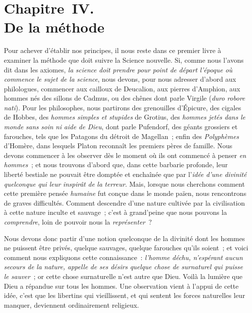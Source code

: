 \documentclass[french,twoside]{book} %
\newcommand\chapteropen{} %
\newcommand\chaptercont{} %
\begin{document}
\chapteropen
\chapter[{Chapitre IV. De la méthode}]{Chapitre IV. \\
De la méthode}

\chaptercont
\noindent  Pour achever d’établir nos principes, il nous reste dans ce premier livre à examiner la méthode que doit suivre la Science nouvelle. Si, comme nous l’avons dit dans les axiomes, {\itshape la science doit prendre pour point de départ l’époque où commence le sujet de la science}, nous devons, pour nous adresser d’abord aux philologues, commencer aux cailloux de Deucalion, aux pierres d’Amphion, aux hommes nés des sillons de Cadmus, ou des chênes dont parle Virgile (\emph{{\itshape duro robore nati}}). Pour les philosophes, nous partirons des grenouilles d’Épicure, des cigales de Hobbes, des \emph{{\itshape hommes simples et stupides}} de Grotius, des \emph{{\itshape hommes jetés dans le monde sans soin ni aide de Dieu}}, dont parle Pufendorf, des géants grossiers et farouches, tels que les Patagons du détroit de Magellan ; enfin des {\itshape Polyphèmes} d’Homère, dans lesquels Platon reconnaît les premiers pères de famille. Nous devons commencer à  les observer dès le moment où ils ont commencé à penser {\itshape en hommes} ; et nous trouvons d’abord que, dans cette barbarie profonde, leur liberté bestiale ne pouvait être domptée et enchaînée que par l’{\itshape idée d’une divinité quelconque qui leur inspirât de la terreur}. Mais, lorsque nous cherchons comment cette première pensée {\itshape humaine} fut conçue dans le monde païen, nous rencontrons de graves difficultés. Comment descendre d’une nature cultivée par la civilisation à cette nature inculte et sauvage ; c’est à grand’peine que nous pouvons la {\itshape comprendre}, loin de pouvoir nous la {\itshape représenter} ?\par
Nous devons donc partir d’une notion quelconque de la divinité dont les hommes ne puissent être privés, quelque sauvages, quelque farouches qu’ils soient ; et voici comment nous expliquons cette connaissance : {\itshape l’homme déchu, n’espérant aucun secours de la nature, appelle de ses désirs quelque chose de surnaturel qui puisse le sauver} ; or cette chose surnaturelle n’est autre que Dieu. Voilà la lumière que Dieu a répandue sur tous les hommes. Une observation vient à l’appui de cette idée, c’est que les libertins qui vieillissent, et qui sentent les forces naturelles leur manquer, deviennent ordinairement religieux.\par
\end{document}
